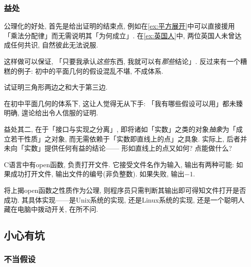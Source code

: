 \documentclass[hidelinks]{ctexart}
\begin{document}

\subsubsection{益处} %
\label{ssub:益处}

公理化的好处, 首先是给出证明的结束点, 例如在\cref{ex:平方展开}中可以直接援用「乘法分配律」而无需说明其「为何成立」. 在\cref{ex:英国人}中, 两位英国人未曾达成任何共识, 自然彼此无法说服.
\par
这样做可以保证, 「只要我承认\emph{这些}东西, 我就可以有\emph{那些}结论」. 反过来有一个糟糕的例子: 初中的平面几何的假设混乱不堪, 不成体系.
\begin{sample}
    \begin{ex}
        试证明三角形两边之和大于第三边.
    \end{ex}
\end{sample}
在初中平面几何的体系下, 这让人觉得无从下手: 「我有哪些假设可以用」都未臻明确, 遑论给出令人信服的证明.
\par
益处其二, 在于「接口与实现之分离」, 即将诸如「实数」之类的对象\emph{抽象}为「成立若干性质」之对象, 而无需依赖于「实数即直线上的点」之具象. 实际上, 后者并未向「实数」提供任何有益的结论—— 形如直线上的点又如何? 点能做什么?
\begin{sample}
    \begin{ex}
        {\ttfamily C}语言中有{\ttfamily open}函数, 负责打开文件. 它接受文件名作为输入, 输出有两种可能: 如果成功打开文件, 输出文件的编号(非负整数). 如果失败, 输出$-1$.
    \end{ex}
    将上揭{\ttfamily open}函数之性质作为公理, 则程序员只需判断其输出即可得知文件打开是否成功. 其具体实现——是Unix系统的实现, 还是Linux系统的实现, 还是一个聪明人藏在电脑中拨动开关, 在所不问.
\end{sample}



\subsection{小心有坑} %
\label{sub:小心有坑}

\subsubsection{不当假设} %
\label{ssub:不当假设}
\end{document}
